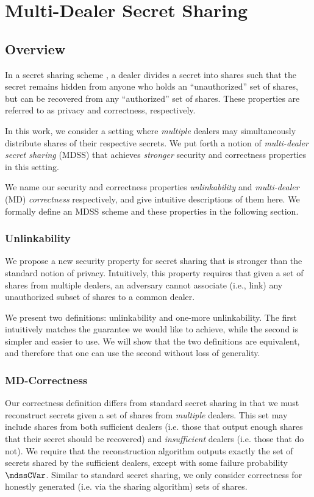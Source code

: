 \chapter{Multi-Dealer Secret Sharing} \label{chap:mdss}

\section{Overview}
In a secret sharing scheme \cite{Shamir79}, a dealer divides a secret into shares such that the secret remains hidden from anyone who holds an ``unauthorized'' set of shares, but can be recovered from any ``authorized'' set of shares.
These properties are referred to as privacy and correctness, respectively.

In this work, we consider a setting where {\em multiple} dealers may simultaneously distribute shares of their respective secrets.
We put forth a notion of {\em multi-dealer secret sharing} (MDSS) that achieves {\em stronger} security and correctness properties in this setting.

We name our security and correctness properties \emph{unlinkability} and \emph{multi-dealer} (MD) \emph{correctness} respectively, and give intuitive descriptions of them here.
We formally define an MDSS scheme and these properties in the following section.

\subsection{Unlinkability}
We propose a new security property for secret sharing that is stronger than the standard notion of privacy.
Intuitively, this property requires that given a set of shares from multiple dealers, an adversary cannot associate (i.e., link) any unauthorized subset of shares to a common dealer.

We present two definitions: unlinkability and one-more unlinkability. The first intuitively matches the  guarantee we would like to achieve, while the second is simpler and easier to use.
We will show that the two definitions are equivalent, and therefore that one can use the second without loss of generality.


\subsection{MD-Correctness}
Our correctness definition differs from standard secret sharing in that we must reconstruct secrets given a set of shares from \emph{multiple} dealers. This set may include shares from both sufficient dealers (i.e. those that output enough shares that their secret should be recovered) and \emph{insufficient} dealers (i.e. those that do not).
We require that the reconstruction algorithm outputs exactly the set of secrets shared by the sufficient dealers, except with some failure probability $\mdssCVar$.
Similar to standard secret sharing, we only consider correctness for honestly generated (i.e. via the sharing algorithm) sets of shares.

